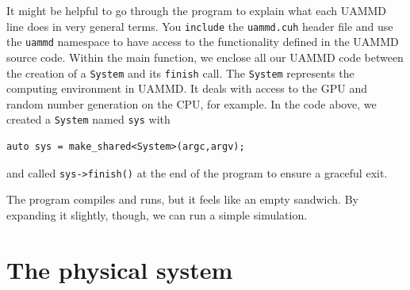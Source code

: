 It might be helpful to go through the program to explain what each UAMMD line 
does in very general terms. You \texttt{include} the \texttt{uammd.cuh} header 
file and use the \texttt{uammd} namespace to have access to the functionality 
defined in the UAMMD source code. Within the main function, we enclose all our 
UAMMD code between the creation of a \texttt{System} and its \texttt{finish}
call. The \texttt{System} represents the computing environment in UAMMD. It
deals with access to the GPU and random number generation on the CPU, for
example. In the code above, we created a \texttt{System} named \texttt{sys} with
\begin{verbatim}
auto sys = make_shared<System>(argc,argv);
\end{verbatim}
and called \texttt{sys->finish()} at the end of the program to ensure a graceful
exit.

The program compiles and runs, but it feels like an empty sandwich. By expanding
it slightly, though, we can run a simple simulation.

\section{\label{physical_system}The physical system}

